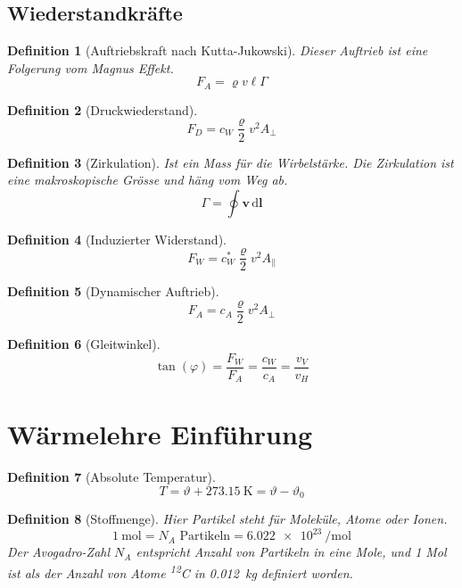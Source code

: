 \documentclass[a4paper, twocolumn]{article}
\numberwithin{equation}{section}
\theoremstyle{hsr-def}
\newtheorem{definition}{Definition}[section]
\theoremstyle{hsr-sub}
\newcommand{\dd}[1]{\ensuremath{\mathrm{d}#1}}
\newcommand{\di}[1]{\,\dd{#1}}
\renewcommand{\vec}[1]{\ensuremath{\mathbf{#1}}}
\begin{document}
\subsection{Wiederstandkr\"afte}
\begin{definition}[Auftriebskraft nach Kutta-Jukowski] Dieser Auftrieb ist eine Folgerung vom \emph{Magnus Effekt}.
\[
    F_A = \varrho v \ell \Gamma
\]
\end{definition}

\begin{definition}[Druckwiederstand]
\[
    F_D = c_W \frac{\varrho}{2}v^2 A_\perp
\]
\end{definition}

\begin{definition}[Zirkulation] Ist ein Mass f\"ur die Wirbelst\"arke.
Die Zirkulation ist eine makroskopische Gr\"osse und h\"ang vom Weg ab.
\[
    \Gamma = \oint \vec{v} \di{\vec{l}}
\]
\end{definition}

\begin{definition}[Induzierter Widerstand]
\[
    F_W = c_W^* \frac{\varrho}{2} v^2 A_\parallel
\]
\end{definition}

\begin{definition}[Dynamischer Auftrieb]
\[
    F_A = c_A \frac{\varrho}{2} v^2 A_\perp
\]
\end{definition}

\begin{definition}[Gleitwinkel]
\[
    \tan(\varphi) = \frac{F_W}{F_A} = \frac{c_W}{c_A} = \frac{v_V}{v_H}
\]
\end{definition}

\section{W\"armelehre Einf\"uhrung}
\begin{definition}[Absolute Temperatur]
\[
    T = \vartheta + \SI{273.15}{\kelvin} = \vartheta - \vartheta_0
\]
\end{definition}

\begin{definition}[Stoffmenge]
Hier \emph{Partikel} steht f\"ur Molek\"ule, Atome oder Ionen.
\[
    \SI{1}{\mole} = N_A \text{ Partikeln} = \SI{6.022e23}{\per\mole}
\]
Der Avogadro-Zahl \(N_A\) entspricht Anzahl von Partikeln in eine Mole, und 1 Mol ist als der Anzahl von Atome \textsuperscript{12}C in \SI{0.012}{\kilo\gram} definiert worden.
\end{definition}
\end{document}
